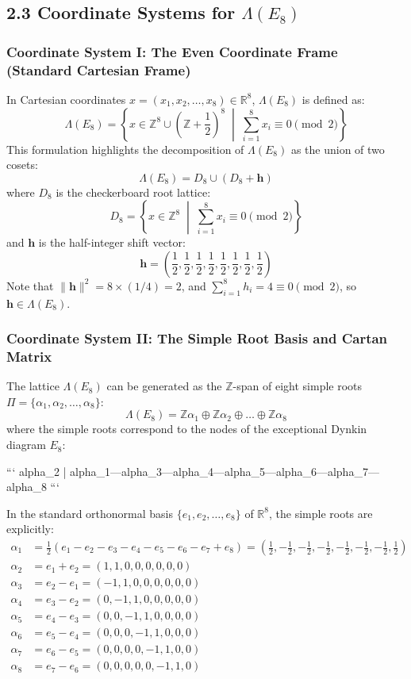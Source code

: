 \documentclass[11pt,twoside,openright]{amsbook}
\begin{document}
\subsection{2.3 Coordinate Systems for $\Lambda(E_8)$}

\subsubsection{Coordinate System I: The Even Coordinate Frame (Standard Cartesian Frame)}
In Cartesian coordinates $x = (x_1, x_2, \dots, x_8) \in \mathbb{R}^8$, $\Lambda(E_8)$ is defined as:
$$\Lambda(E_8) = \left\{ x \in \mathbb{Z}^8 \cup \left( \mathbb{Z} + \frac{1}{2} \right)^8 \;\middle|\; \sum_{i=1}^8 x_i \equiv 0 \pmod 2 \right\}$$
This formulation highlights the decomposition of $\Lambda(E_8)$ as the union of two cosets:
$$\Lambda(E_8) = D_8 \cup \left( D_8 + \mathbf{h} \right)$$
where $D_8$ is the checkerboard root lattice:
$$D_8 = \left\{ x \in \mathbb{Z}^8 \;\middle|\; \sum_{i=1}^8 x_i \equiv 0 \pmod 2 \right\}$$
and $\mathbf{h}$ is the half-integer shift vector:
$$\mathbf{h} = \left( \frac{1}{2}, \frac{1}{2}, \frac{1}{2}, \frac{1}{2}, \frac{1}{2}, \frac{1}{2}, \frac{1}{2}, \frac{1}{2} \right)$$
Note that $\|\mathbf{h}\|^2 = 8 \times (1/4) = 2$, and $\sum_{i=1}^8 h_i = 4 \equiv 0 \pmod 2$, so $\mathbf{h} \in \Lambda(E_8)$.

\subsubsection{Coordinate System II: The Simple Root Basis and Cartan Matrix}
The lattice $\Lambda(E_8)$ can be generated as the $\mathbb{Z}$-span of eight simple roots $\Pi = \{\alpha_1, \alpha_2, \dots, \alpha_8\}$:
$$\Lambda(E_8) = \mathbb{Z}\alpha_1 \oplus \mathbb{Z}\alpha_2 \oplus \dots \oplus \mathbb{Z}\alpha_8$$
where the simple roots correspond to the nodes of the exceptional Dynkin diagram $E_8$:

```
                      alpha_2
                         |
  alpha_1---alpha_3---alpha_4---alpha_5---alpha_6---alpha_7---alpha_8
```

In the standard orthonormal basis $\{e_1, e_2, \dots, e_8\}$ of $\mathbb{R}^8$, the simple roots are explicitly:
$$\begin{aligned}
\alpha_1 &= \frac{1}{2}(e_1 - e_2 - e_3 - e_4 - e_5 - e_6 - e_7 + e_8) = \left( \frac{1}{2}, -\frac{1}{2}, -\frac{1}{2}, -\frac{1}{2}, -\frac{1}{2}, -\frac{1}{2}, -\frac{1}{2}, \frac{1}{2} \right) \\
\alpha_2 &= e_1 + e_2 = (1, 1, 0, 0, 0, 0, 0, 0) \\
\alpha_3 &= e_2 - e_1 = (-1, 1, 0, 0, 0, 0, 0, 0) \\
\alpha_4 &= e_3 - e_2 = (0, -1, 1, 0, 0, 0, 0, 0) \\
\alpha_5 &= e_4 - e_3 = (0, 0, -1, 1, 0, 0, 0, 0) \\
\alpha_6 &= e_5 - e_4 = (0, 0, 0, -1, 1, 0, 0, 0) \\
\alpha_7 &= e_6 - e_5 = (0, 0, 0, 0, -1, 1, 0, 0) \\
\alpha_8 &= e_7 - e_6 = (0, 0, 0, 0, 0, -1, 1, 0)
\end{aligned}$$
\end{document}
